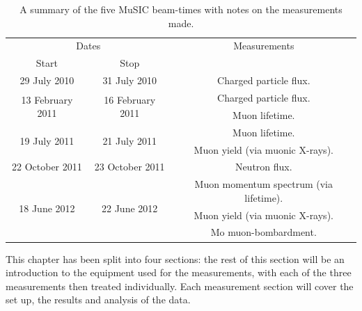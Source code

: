 \begin{table}[htpb]
  \begin{center}
    \begin{tabular}{c|c|c}
      \multicolumn{2}{c|}{Dates}          & Measurements                                \\
      Start            & Stop             &                                             \\
      \hline                                                                             
      29 July 2010     & 31 July 2010     & Charged particle flux.                      \\
      \hline
      \multirow{2}{*}{13 February 2011}
                       & \multirow{2}{*}{16 February 2011}
                                           & Charged particle flux.                     \\
                       &                   & Muon lifetime.                             \\
      \hline
      \multirow{2}{*}{19 July 2011}
                       & \multirow{2}{*}{21 July 2011}
                                          & Muon lifetime.                              \\
                       &                  & Muon yield (via muonic X-rays).             \\
      \hline
      22 October 2011  & 23 October 2011  & Neutron flux.                               \\
      \hline
      \multirow{3}{*}{18 June 2012}
                       & \multirow{3}{*}{22 June 2012}    
                                          & Muon momentum spectrum (via lifetime).      \\
                       &                  & Muon yield (via muonic X-rays).             \\
                       &                  & Mo muon-bombardment.                        \\
    \end{tabular}
  \end{center}
  \caption{A summary of the five MuSIC beam-times with notes on the measurements made.}
  \label{tab:summary_music_beam_time}
\end{table}

This chapter has been split into four sections: the rest of this section will be an introduction to the equipment used for the measurements, with each of the three measurements then treated individually. Each measurement section will cover the set up, the results and analysis of the data.

